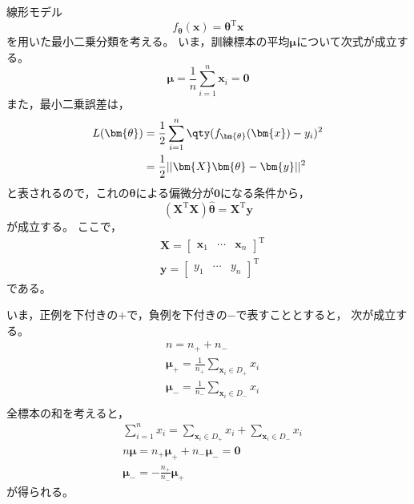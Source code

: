 \documentclass[class=jsarticle, crop=false, dvipdfmx, fleqn]{standalone}
\begin{document}
\section{}

線形モデル
\begin{equation}
	f_{\bm{\theta}}(\bm{x}) = \bm{\theta}^\mathrm{T} \bm{x}
\end{equation}
を用いた最小二乗分類を考える。
いま，訓練標本の平均\(\bm{\mu}\)について次式が成立する。
\begin{equation}
	\bm{\mu} = \frac{1}{n} \sum_{i=1}^{n} \bm{x}_i = \bm{0}
\end{equation}
また，最小二乗誤差は，
\begin{align}
	L(\bm{\theta})
		& = \frac{1}{2} \sum_{i=1}^{n} \qty(f_{\bm{\theta}}(\bm{x}) - y_i)^2 \\
		& = \frac{1}{2} ||\bm{X} \bm{\theta} - \bm{y}||^2
\end{align}
と表されるので，これの\(\bm{\theta}\)による偏微分が\(\bm{0}\)になる条件から，
\begin{equation}
	(\bm{X}^\mathrm{T} \bm{X}) \hat{\bm{\theta}} = \bm{X}^\mathrm{T} \bm{y}
	\label{eq:theta_opt}
\end{equation}
が成立する。
ここで，
\begin{align}
	& \bm{X} =
		\begin{bmatrix}
			\bm{x}_1 & \cdots & \bm{x}_n
		\end{bmatrix}^\mathrm{T} \\
	& \bm{y} =
		\begin{bmatrix}
			y_1 & \cdots & y_n
		\end{bmatrix}^\mathrm{T}
\end{align}
である。

いま，正例を下付きの\(+\)で，負例を下付きの\(-\)で表すこととすると，
次が成立する。
\begin{align}
	& n = n_+ + n_- \\
	& \bm{\mu}_+ = \frac{1}{n_+} \sum_{\bm{x}_i \in D_+} x_i \\
	& \bm{\mu}_- = \frac{1}{n_-} \sum_{\bm{x}_i \in D_-} x_i \\
\end{align}
全標本の和を考えると，
\begin{align}
	& \sum_{i=1}^{n} x_i = \sum_{\bm{x}_i \in D_+} x_i + \sum_{\bm{x}_i \in D_-} x_i \\
	& n \bm{\mu} = n_+ \bm{\mu}_+ + n_- \bm{\mu}_- = \bm{0} \\
	& \bm{\mu}_- = - \frac{n_+}{n_-} \bm{\mu}_+
\end{align}
が得られる。
\end{document}
